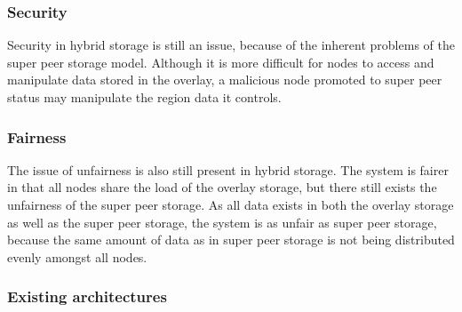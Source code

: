 \documentclass[10pt,a4paper,journal,cspaper,compsoc]{IEEEtran}
\begin{document}
\subsubsection{Security}

Security in hybrid storage is still an issue, because of the inherent problems of the super peer storage model. Although it is more difficult for
nodes to access and manipulate data stored in the overlay, a malicious node promoted to super peer status may manipulate the region data it controls.

\subsubsection{Fairness}

The issue of unfairness is also still present in hybrid storage. The system is fairer in that all nodes share the load of the overlay storage, but
there still exists the unfairness of the super peer storage. As all data exists in both the overlay storage as well as the super peer storage, the
system is as unfair as super peer storage, because the same amount of data as in super peer storage is not being distributed evenly amongst all
nodes.

\subsubsection{Existing architectures}
\end{document}
